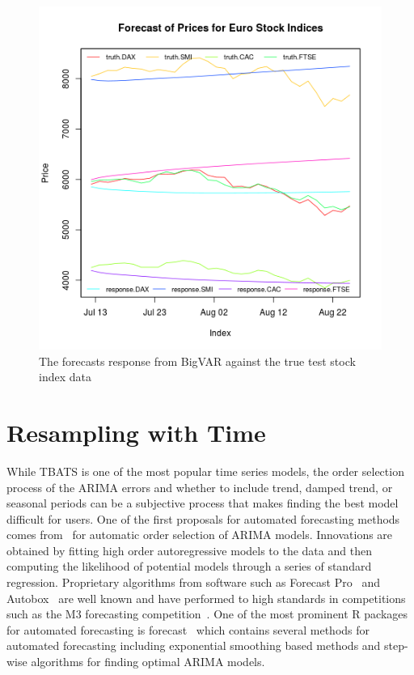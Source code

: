 \documentclass[12pt]{article}\usepackage[]{graphicx}\usepackage[]{color}
\theoremstyle{definition}
\let\proglang=\textsf
\newcommand{\pkg}[1]{{\fontseries{b}\selectfont #1}}
\begin{document}
\begin{figure}[H]
\includegraphics[width=\linewidth]{plot_bigvar_train.png}
\centering
\caption{The forecasts response from BigVAR against the true test stock index data}
\label{fig:bigvar_train}
\end{figure}
\doublespacing

\section{Resampling with Time}
\label{sec:resamp}


While TBATS is one of the most popular time series models, the order selection process of the ARIMA errors and whether to include trend, damped trend, or seasonal periods can be a subjective process that makes finding the best model difficult for users. One of the first proposals for automated forecasting methods comes from~\cite{hannanOrder} for automatic order selection of ARIMA models. Innovations are obtained by fitting high order autoregressive models to the data and then computing the likelihood of potential models through a series of standard regression. Proprietary algorithms from software such as \proglang{Forecast Pro}~\cite{forecastpro} and \proglang{Autobox}~\cite{reillyautobox} are well known and have performed to high standards in competitions such as the M3 forecasting competition~\cite{Makridakis2000451}. One of the most prominent R packages for automated forecasting is \pkg{forecast}~\cite{HyndForecast} which contains several methods for automated forecasting including exponential smoothing based methods and step-wise algorithms for finding optimal ARIMA models.
\end{document}
